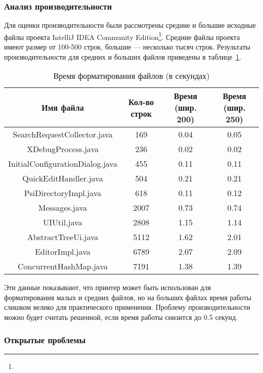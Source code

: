 \newpage
\subsubsection{Анализ производительности}

Для оценки производительности были рассмотрены средние и большие исходные файлы
проекта IntelliJ IDEA Community
Edition\footnote{}.
Средние файлы проекта имеют размер от 100-500 строк, большие --- несколько тысяч строк.
Результаты производительности для средних и больших файлов приведены в
таблице~\ref{tbl:pluginPerformanceTbl}.

\begin{table}[h!]
	\centering

    \begin{tabular}{c c c c}
    Имя файла & Кол-во строк & Время (шир. 200) & Время (шир. 250) \\
    \hline
    SearchRequestCollector.java & 169 & 0.04 & 0.05\\
    XDebugProcess.java & 236 & 0.02 & 0.02\\
    InitialConfigurationDialog.java & 455 & 0.11 & 0.11 \\
    QuickEditHandler.java & 504 & 0.21 & 0.21\\
    PsiDirectoryImpl.java & 618 & 0.11 & 0.12\\
    \hline
    Messages.java & 2007 & 0.73 & 0.74 \\
    UIUtil.java & 2808 & 1.15 & 1.14 \\
    AbstractTreeUi.java & 5112 & 1.62 & 2.01 \\
    EditorImpl.java & 6789 & 2.07 & 2.09\\
    ConcurrentHashMap.java & 7191 & 1.38 & 1.39
    \end{tabular}

  \caption{Время форматирования файлов (в секундах)}
	\label{tbl:pluginPerformanceTbl}
\end{table}

Эти данные показывают, что принтер может быть использован для
форматирования малых и средних файлов, но на больших файлах время
работы слишком велико для практического применения. Проблему производительности
можно будет считать решенной, если время работы снизится до 0.5 секунд.

\subsubsection{Открытые проблемы}

